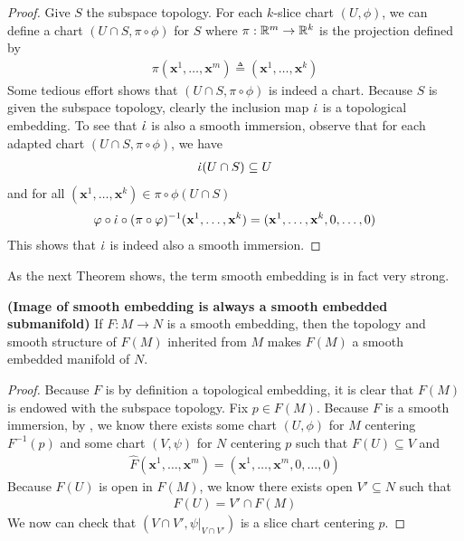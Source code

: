 \documentclass{report}
\begin{document}
\begin{proof}
Give $S$ the subspace topology. For each $k$-slice chart  $(U,\phi)$, we can define a chart $(U\cap S,\pi \circ \phi)$ for $S$ where  $\pi:\mathbb{R}^m \rightarrow \mathbb{R}^k$ is the projection defined by 
\begin{align*}
\pi (\textbf{x}^1,\dots ,\textbf{x}^m)\triangleq (\textbf{x}^1,\dots ,\textbf{x}^k)
\end{align*}
Some tedious effort shows that $(U\cap S,\pi \circ \phi )$ is indeed a chart. Because $S$ is given the subspace topology, clearly the inclusion map  $\dot{\iota} $ is a topological embedding. To see that $\dot{\iota}$ is also a smooth immersion, observe that for each adapted chart $(U\cap S,\pi \circ \phi)$, we have
\begin{align*}
\dot{\iota} (U \cap S)\subseteq U 
\end{align*}
and for all $(\textbf{x}^1,\dots ,\textbf{x}^k)\in \pi \circ  \phi (U \cap S)$ 
\begin{align*}
\varphi \circ \dot{\iota} \circ (\pi \circ \varphi)^{-1}(\textbf{x}^1,\dots ,\textbf{x}^k)=  (\textbf{x}^1,\dots ,\textbf{x}^k, 0,\dots ,0)
\end{align*}
This shows that $\dot{\iota} $ is indeed also a smooth immersion.  
\end{proof}
\begin{mdframed}
As the next Theorem shows, the term smooth embedding is in fact very strong. 
\end{mdframed}
\begin{theorem}
\label{Ios}
\textbf{(Image of smooth embedding is always a smooth embedded submanifold)} If $F:M\rightarrow N$ is a smooth embedding, then the topology and smooth structure of $F(M)$ inherited from $M$ makes  $F(M)$ a smooth embedded manifold of $N$.  
\end{theorem}
\begin{proof}
Because $F$ is by definition a topological embedding, it is clear that $F(M)$ is endowed with the subspace topology. Fix $p \in F(M)$. Because $F$ is a smooth immersion, by  , we know there exists some chart  $(U,\phi)$ for $M$ centering $F^{-1}(p)$ and some chart $(V,\psi)$ for $N$ centering  $p$ such that  $F(U)\subseteq V$ and 
\begin{align*}
\widehat{F}(\textbf{x}^1,\dots ,\textbf{x}^m)=(\textbf{x}^1,\dots ,\textbf{x}^m ,0,\dots ,0)
\end{align*}
Because $F(U)$ is open in $F(M)$, we know there exists open $V'\subseteq N$ such that 
\begin{align*}
F(U)=V' \cap F(M)
\end{align*}
We now can check that $(V\cap V', \psi|_{V\cap V'})$ is a slice chart centering $p$. 
\end{proof}
\end{document}
